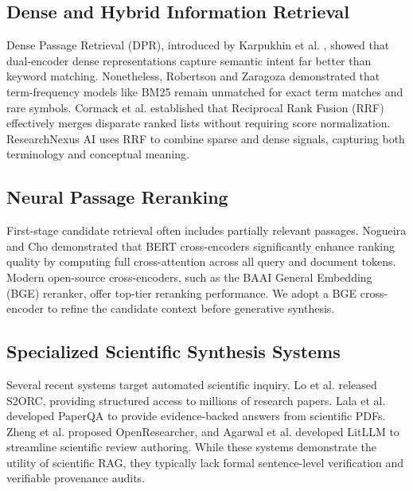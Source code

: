 \documentclass[conference]{IEEEtran}
\begin{document}
\subsection{Dense and Hybrid Information Retrieval}
Dense Passage Retrieval (DPR), introduced by Karpukhin et al. \cite{karpukhin2020dpr}, showed that dual-encoder dense representations capture semantic intent far better than keyword matching. Nonetheless, Robertson and Zaragoza \cite{robertson2009bm25} demonstrated that term-frequency models like BM25 remain unmatched for exact term matches and rare symbols. Cormack et al. \cite{cormack2009rrf} established that Reciprocal Rank Fusion (RRF) effectively merges disparate ranked lists without requiring score normalization. ResearchNexus AI uses RRF to combine sparse and dense signals, capturing both terminology and conceptual meaning.

\subsection{Neural Passage Reranking}
First-stage candidate retrieval often includes partially relevant passages. Nogueira and Cho \cite{nogueira2019reranking} demonstrated that BERT cross-encoders significantly enhance ranking quality by computing full cross-attention across all query and document tokens. Modern open-source cross-encoders, such as the BAAI General Embedding (BGE) reranker, offer top-tier reranking performance. We adopt a BGE cross-encoder to refine the candidate context before generative synthesis.

\subsection{Specialized Scientific Synthesis Systems}
Several recent systems target automated scientific inquiry. Lo et al. \cite{lo2020s2orc} released S2ORC, providing structured access to millions of research papers. Lala et al. \cite{lala2023paperqa} developed PaperQA to provide evidence-backed answers from scientific PDFs. Zheng et al. \cite{zheng2024openresearcher} proposed OpenResearcher, and Agarwal et al. \cite{agarwal2024litllm} developed LitLLM to streamline scientific review authoring. While these systems demonstrate the utility of scientific RAG, they typically lack formal sentence-level verification and verifiable provenance audits.
\end{document}
